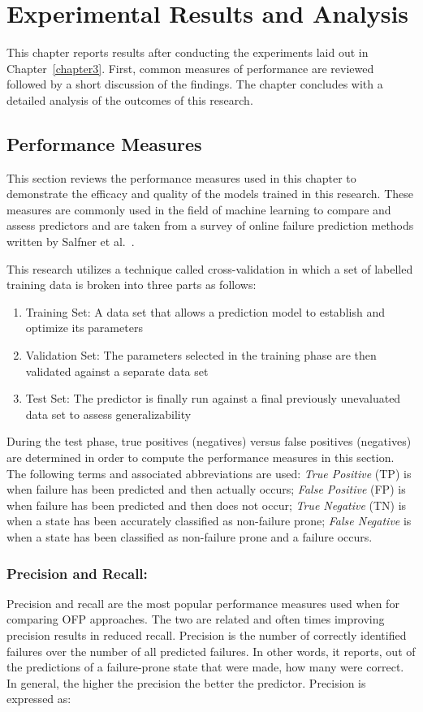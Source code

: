 \chapter{Experimental Results and Analysis} \label{chapter4}
This chapter reports results after conducting the experiments laid out in
Chapter~\ref{chapter3}.  First, common measures of performance are reviewed
followed by a short discussion of the findings.  The chapter concludes with a
detailed analysis of the outcomes of this research.

\section{Performance Measures} \label{metrics}
This section reviews the performance measures used in this chapter to
demonstrate the efficacy and quality of the models trained in this research.
These measures are commonly used in the field of machine learning to compare
and assess predictors and are taken from a survey of online failure prediction
methods written by Salfner et al.~\cite{salfnerSurvey}.

This research utilizes a technique called cross-validation in which a set of
labelled training data is broken into three parts as follows:
\begin{enumerate}
\item{Training Set:  A data set that allows a prediction model to establish and
optimize its parameters}
\item{Validation Set:  The parameters selected in the training phase are then
validated against a separate data set}
\item{Test Set:  The predictor is finally run against a final previously
unevaluated data set to assess generalizability}
\end{enumerate}
During the test phase, true positives (negatives) versus false positives
(negatives) are determined in order to compute the performance measures in
this section.  The following terms and associated abbreviations are used:
\emph{True Positive} (TP) is when failure has been predicted and then actually
occurs; \emph{False Positive} (FP) is when failure has been predicted and then
does not occur; \emph{True Negative} (TN) is when a state has been accurately
classified as non-failure prone; \emph{False Negative} is when a state has been
classified as non-failure prone and a failure occurs.

\subsection{Precision and Recall:}
Precision and recall are the most popular performance measures used when
for comparing OFP approaches.  The two are related and often times
improving precision results in reduced recall.  Precision is the number of
correctly identified failures over the number of all predicted failures.  In
other words, it reports, out of the predictions of a failure-prone state that
were made, how many were correct.  In general, the higher the precision the
better the predictor.  Precision is expressed as:

